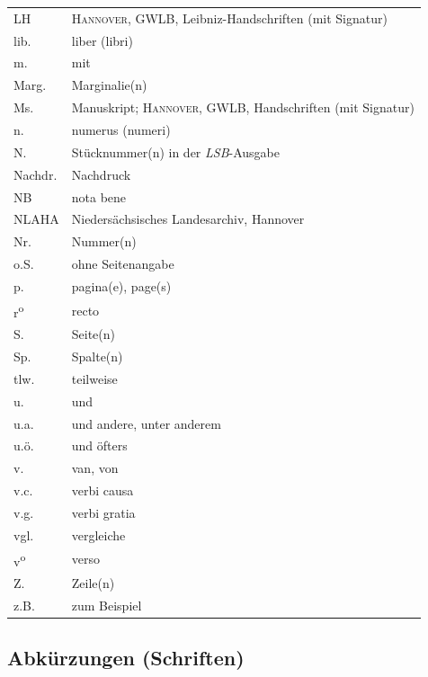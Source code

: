 \begin{longtable}{ll}
LH 		& \textsc{Hannover}, GWLB, Leibniz-Handschriften (mit Signatur)\\
lib. 		& liber (libri)\\
m. 		& mit\\
Marg. 	& Marginalie(n)\\
Ms. 		& Manuskript; \textsc{Hannover}, GWLB, Handschriften (mit Signatur)\\
n. 		& numerus (numeri)\\
N. 		& Stücknummer(n) in der \textit{LSB}-Ausgabe\\
Nachdr. 	& Nachdruck\\
NB 		& nota bene\\
NLA\;HA 	& Niedersächsisches Landesarchiv, Hannover\\
Nr. 		& Nummer(n)\\
o.S. 		& ohne Seitenangabe\\
p. 		& pagina(e), page(s)\\
r\textsuperscript{o} 	& recto\\
S. 		& Seite(n)\\
Sp. 		& Spalte(n)\\
tlw. 		& teilweise\\
u. 		& und\\
u.a. 		& und andere, unter anderem\\
u.ö. 		& und öfters\\
v. 		& van, von\\
v.c. 		& verbi causa\\
v.g. 		& verbi gratia\\
vgl. 		& vergleiche\\
v\textsuperscript{o} 	& verso\\
Z. 		& Zeile(n)\\
z.B. 		& zum Beispiel
\end{longtable}

\clearpage


\subsection{Abkürzungen (S\lowercase{chriften)}}
\vspace{1ex}

